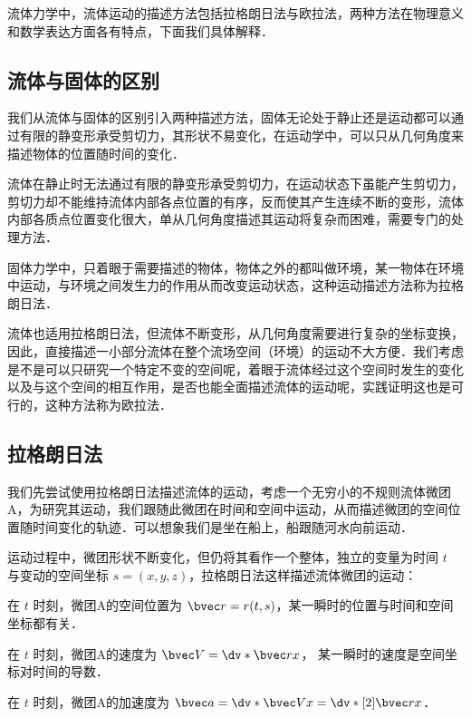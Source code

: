 
\begin{issues}
\issueDraft
\end{issues}

流体力学中，流体运动的描述方法包括拉格朗日法与欧拉法，两种方法在物理意义和数学表达方面各有特点，下面我们具体解释．

\subsection{流体与固体的区别}
我们从流体与固体的区别引入两种描述方法，固体无论处于静止还是运动都可以通过有限的静变形承受剪切力，其形状不易变化，在运动学中，可以只从几何角度来描述物体的位置随时间的变化．

流体在静止时无法通过有限的静变形承受剪切力，在运动状态下虽能产生剪切力，剪切力却不能维持流体内部各点位置的有序，反而使其产生连续不断的变形，流体内部各质点位置变化很大，单从几何角度描述其运动将复杂而困难，需要专门的处理方法．

固体力学中，只着眼于需要描述的物体，物体之外的都叫做环境，某一物体在环境中运动，与环境之间发生力的作用从而改变运动状态，这种运动描述方法称为拉格朗日法．

流体也适用拉格朗日法，但流体不断变形，从几何角度需要进行复杂的坐标变换，因此，直接描述一小部分流体在整个流场空间（环境）的运动不大方便．我们考虑是不是可以只研究一个特定不变的空间呢，着眼于流体经过这个空间时发生的变化以及与这个空间的相互作用，是否也能全面描述流体的运动呢，实践证明这也是可行的，这种方法称为欧拉法．

\subsection{拉格朗日法}
我们先尝试使用拉格朗日法描述流体的运动，考虑一个无穷小的不规则流体微团A，为研究其运动，我们跟随此微团在时间和空间中运动，从而描述微团的空间位置随时间变化的轨迹．可以想象我们是坐在船上，船跟随河水向前运动．

运动过程中，微团形状不断变化，但仍将其看作一个整体，独立的变量为时间 $t$ 与变动的空间坐标 $s=(x,y,z)$，拉格朗日法这样描述流体微团的运动：

在 $t$ 时刻，微团A的空间位置为 $\bvec r=r(t,s)$，某一瞬时的位置与时间和空间坐标都有关．

在 $t$ 时刻，微团A的速度为 $\bvec V=\dv*{\bvec r}{x}$，
某一瞬时的速度是空间坐标对时间的导数．

在 $t$ 时刻，微团A的加速度为 $\bvec a=\dv*{\bvec V}{x}=\dv*[2]{\bvec r}{x}$．

